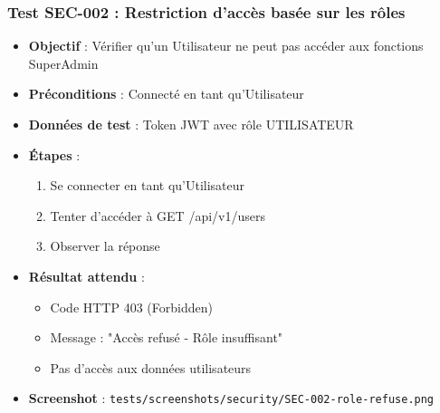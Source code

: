 \subsubsection{Test SEC-002 : Restriction d'accès basée sur les rôles}
\begin{itemize}
    \item \textbf{Objectif} : Vérifier qu'un Utilisateur ne peut pas accéder aux fonctions SuperAdmin
    \item \textbf{Préconditions} : Connecté en tant qu'Utilisateur
    \item \textbf{Données de test} : Token JWT avec rôle UTILISATEUR
    \item \textbf{Étapes} :
        \begin{enumerate}
            \item Se connecter en tant qu'Utilisateur
            \item Tenter d'accéder à GET /api/v1/users
            \item Observer la réponse
        \end{enumerate}
    \item \textbf{Résultat attendu} : 
        \begin{itemize}
            \item Code HTTP 403 (Forbidden)
            \item Message : "Accès refusé - Rôle insuffisant"
            \item Pas d'accès aux données utilisateurs
        \end{itemize}
    \item \textbf{Screenshot} : \texttt{tests/screenshots/security/SEC-002-role-refuse.png}
\end{itemize}

